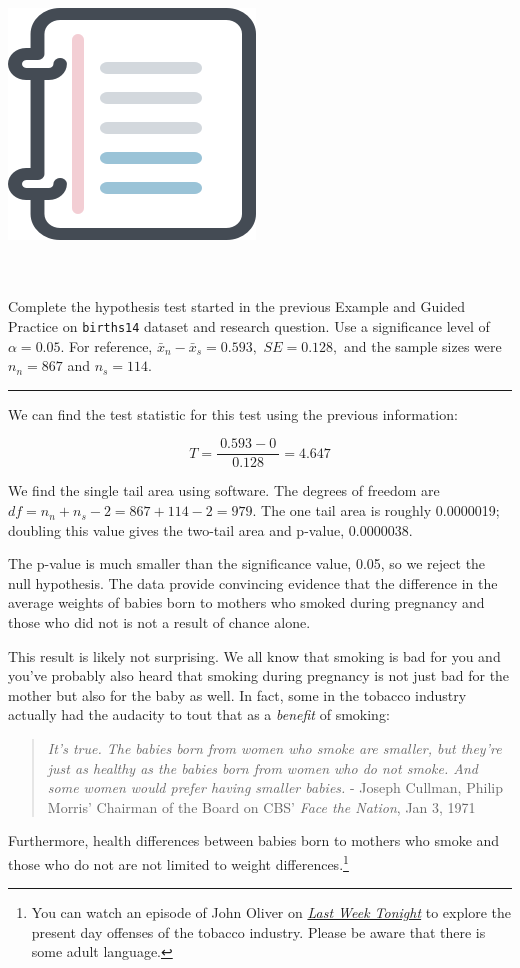 \documentclass[
  10pt,
  openany]{book}
\newenvironment{mdframedwithfootGPWE}
{   
    \savenotes
    \begin{mdframed}[%
    topline=true, bottomline=true, linecolor=oiB, linewidth=0.5pt,
    rightline=false, leftline=false,
    backgroundcolor=oiLGray]
    \renewcommand{\thempfootnote}{\arabic{footnote}}
    }
{
    \end{mdframed}
    \spewnotes
}
\newenvironment{workedexample}{
    \let\oldrule\rule
    \renewcommand{\rule}[2]{\vspace{-2mm}\oldrule{##1}{##2}\vspace{-2mm}}
\vspace{4mm}
\begin{mdframedwithfootGPWE}
\begin{minipage}[t]{0.10\textwidth}
{$\:$ \\ \setkeys{Gin}{width=2.5em,keepaspectratio}\includegraphics{images/_icons/worked-example.png}}
\end{minipage}
\hfill
\begin{minipage}[t]{0.90\textwidth}
\vspace{-2mm}
\setlength{\parskip}{1em}
\noindent\textbf{\color{oiB}\small\fontfamily{phv}\selectfont{\MakeUppercase{Example}}} $\:$ \\ \\
}{\end{minipage}
\end{mdframedwithfootGPWE}
\vspace{4mm}
}
\begin{document}
\begin{workedexample}
Complete the hypothesis test started in the previous Example and Guided Practice on \texttt{births14} dataset and research question.
Use a significance level of \(\alpha=0.05.\) For reference, \(\bar{x}_{n} - \bar{x}_{s} = 0.593,\) \(SE = 0.128,\) and the sample sizes were \(n_n = 867\) and \(n_s = 114\).

\begin{center}\rule{0.5\linewidth}{0.5pt}\end{center}

We can find the test statistic for this test using the previous information:

\[T = \frac{\ 0.593 - 0\ }{0.128} = 4.647\]

We find the single tail area using software.
The degrees of freedom are \(df = n_n + n_s - 2 = 867 + 114 - 2 = 979\).
The one tail area is roughly 0.0000019; doubling this value gives the two-tail area and p-value, 0.0000038.

The p-value is much smaller than the significance value, 0.05, so we reject the null hypothesis.
The data provide convincing evidence that the difference in the average weights of babies born to mothers who smoked during pregnancy and those who did not is not a result of chance alone.

\end{workedexample}

This result is likely not surprising.
We all know that smoking is bad for you and you've probably also heard that smoking during pregnancy is not just bad for the mother but also for the baby as well.
In fact, some in the tobacco industry actually had the audacity to tout that as a \emph{benefit} of smoking:

\begin{quote}
\emph{It's true. The babies born from women who smoke are smaller, but they're just as healthy as the babies born from women who do not smoke. And some women would prefer having smaller babies.} - Joseph Cullman, Philip Morris' Chairman of the Board on CBS' \emph{Face the Nation}, Jan 3, 1971
\end{quote}

Furthermore, health differences between babies born to mothers who smoke and those who do not are not limited to weight differences.\footnote{You can watch an episode of John Oliver on \href{youtu.be/6UsHHOCH4q8}{\emph{Last Week Tonight}} to explore the present day offenses of the tobacco industry.
  Please be aware that there is some adult language.}
\end{document}
